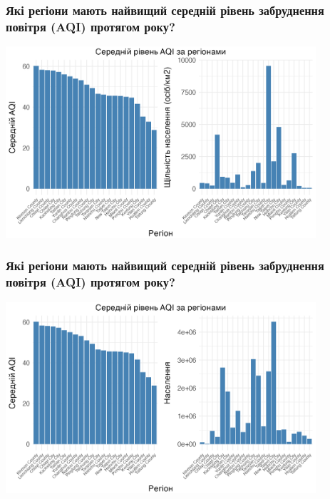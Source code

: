 \documentclass{beamer}
\begin{document}
\begin{frame}
  \frametitle{Які регіони мають найвищий середній рівень забруднення повітря (AQI) протягом року?}

  \begin{center}
    \includegraphics[height=2.8in]{plots/question4/avg_aqi_by_county_w_dens.png}
  \end{center}
\end{frame}

\begin{frame}
  \frametitle{Які регіони мають найвищий середній рівень забруднення повітря (AQI) протягом року?}

  \begin{center}
    \includegraphics[height=2.8in]{plots/question4/avg_aqi_by_county_w_pop.png}
  \end{center}
\end{frame}
\end{document}
